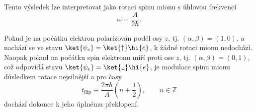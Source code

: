 \begin{solution}
\begin{enumerate}
		Tento výsledek lze interpretovat jako rotaci spinu mionu s úhlovou frekvencí 
		\begin{equation}
			\omega=\frac{A}{2\hbar}.
		\end{equation}
		
		\begin{note}
			Pokud je na počátku elektron polarizován podél osy $z$, tj. $(\alpha,\beta)=(1,0)$, a nachází se ve stavu $\ket{\psi_{e}}=\ket{\uparrow}\hi{e}$, k žádné rotaci mionu nedochází.
			Naopak pokud na počátku spin elektronu míří proti ose $z$, tj. $(\alpha,\beta)=(0,1)$, což odpovídá stavu $\ket{\psi_{e}}=\ket{\downarrow}\hi{e}$, je modulace spinu mionu důsledkem rotace nejsilnější a pro časy
			\begin{equation}
				t_{\mathrm{flip}}\equiv\frac{2\pi\hbar}{A}\left(n+\frac{1}{2}\right),\qquad n\in\mathbb{Z}
			\end{equation}
			dochází dokonce k jeho úplnému překlopení.
		\end{note}


\end{enumerate}
\end{solution}
